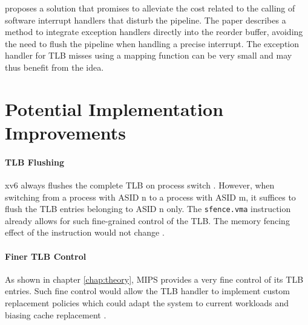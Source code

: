 \cite{jaleel2001line} proposes a solution that promises to alleviate the cost related to the calling of software interrupt handlers that disturb the pipeline. The paper describes a method to integrate exception handlers directly into the reorder buffer, avoiding the need to flush the pipeline when handling a precise interrupt. The exception handler for TLB misses using a mapping function can be very small and may thus benefit from the idea.





\section{Potential Implementation Improvements}

\paragraph{TLB Flushing} xv6 always flushes the complete TLB on process switch \cite{cox2011xv6}. However, when switching from a process with ASID n to a process with ASID m, it suffices to flush the TLB entries belonging to ASID n only. The \texttt{sfence.vma} instruction already allows for such fine-grained control of the TLB. The memory fencing effect of the instruction would not change \cite{RISCVInstructionSet}.

\paragraph{Finer TLB Control} As shown in chapter \ref{chap:theory}, MIPS \cite{MIPSArchitectureProgrammers2016} provides a very fine control of its TLB entries. Such fine control would allow the TLB handler to implement custom replacement policies which could adapt the system to current workloads and biasing cache replacement \cite{park2022every}.


%


